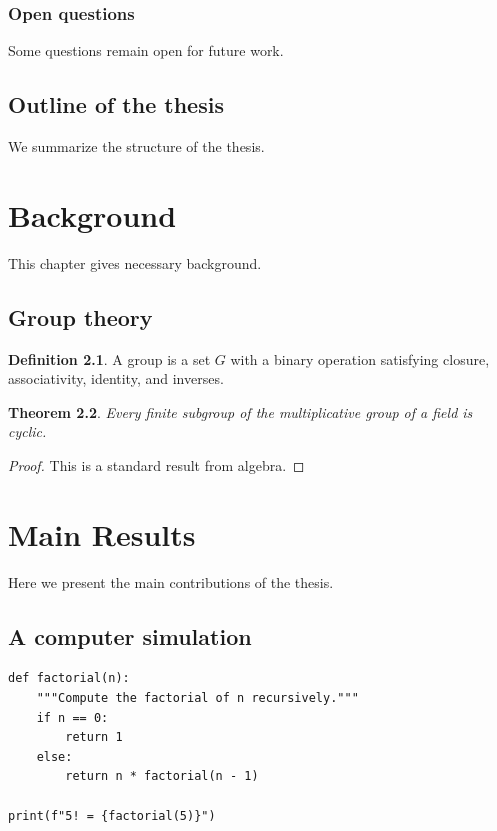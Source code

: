 \documentclass[12pt,reqno]{amsbook}
\newtheorem{theorem}{Theorem}[chapter]
\theoremstyle{definition}
\newtheorem{definition}[theorem]{Definition}
\begin{document}
\subsection{Open questions}
Some questions remain open for future work.

\section{Outline of the thesis}
We summarize the structure of the thesis.

\chapter{Background}
This chapter gives necessary background.

\section{Group theory}
\begin{definition}
A group is a set $G$ with a binary operation satisfying closure, associativity, identity, and inverses.
\end{definition}

\begin{theorem}
Every finite subgroup of the multiplicative group of a field is cyclic.
\end{theorem}

\begin{proof}
This is a standard result from algebra.
\end{proof}

\chapter{Main Results}
Here we present the main contributions of the thesis.

\section{A computer simulation}

\begin{lstlisting}[basicstyle = \ttfamily\small,resetmargins=true,tabsize=5,extendedchars=false]
def factorial(n):
    """Compute the factorial of n recursively."""
    if n == 0:
        return 1
    else:
        return n * factorial(n - 1)

print(f"5! = {factorial(5)}")
\end{lstlisting}
\end{document}
